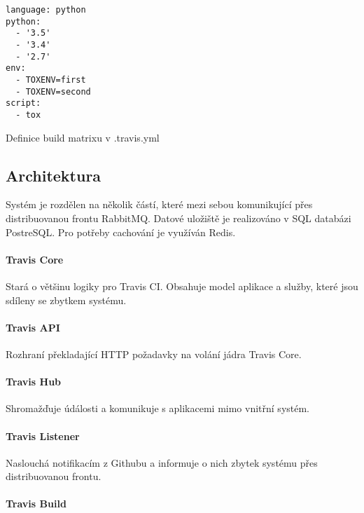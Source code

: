 \begin{listing}[ht]
\begin{verbatim}
language: python
python:
  - '3.5'
  - '3.4'
  - '2.7'
env:
  - TOXENV=first
  - TOXENV=second
script:
  - tox
\end{verbatim}
\label{code:travis-matrix}
\caption{Definice build matrixu v .travis.yml}
\end{listing}

\subsection{Architektura}

Systém je rozdělen na několik částí, které mezi sebou komunikující přes distribuovanou frontu RabbitMQ.
Datové uložiště je realizováno v SQL databázi PostreSQL.
Pro potřeby cachování je využíván Redis.


\paragraph{Travis Core}

Stará o většinu logiky pro Travis CI.
Obsahuje model aplikace a služby, které jsou sdíleny se zbytkem systému.

\paragraph{Travis API}

Rozhraní překladající HTTP požadavky na volání jádra Travis Core.

\paragraph{Travis Hub}

Shromažďuje údálosti a komunikuje s aplikacemi mimo vnitřní systém.

\paragraph{Travis Listener}

Naslouchá notifikacím z Githubu a informuje o nich zbytek systému přes distribuovanou frontu.

\paragraph{Travis Build}

